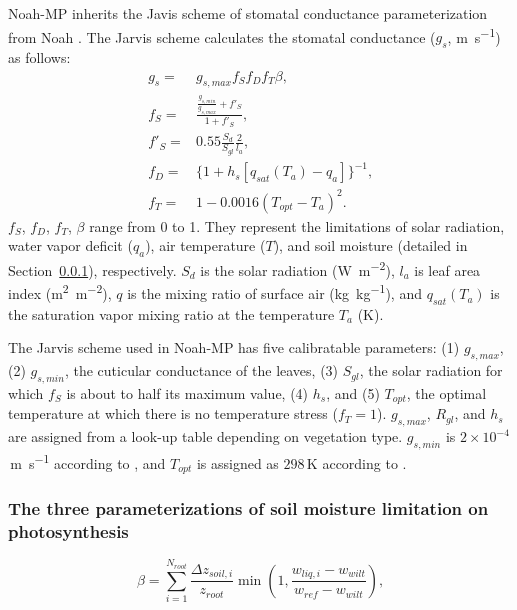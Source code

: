 \documentclass[essd]{copernicus}
\begin{document}
Noah-MP inherits the Javis scheme \citep{jarvis1976PTRSLBBS} of stomatal
conductance parameterization from Noah \citep{chen2001MWR}. The Jarvis scheme
calculates the stomatal conductance (\(g_s\), \si{m~s^{-1}}) as follows:
\begin{align}
  g_s =    & g_{s,max} f_{S} f_{D} f_{T} \beta \text{,} \\
  f_{S} =  & \frac{\frac{g_{s,min}}{g_{s,max}}+f'_{S}}{1+f'_{S}} \text{,} \\
  f'_{S} = & 0.55 \frac{S_d}{S_{gl}} \frac{2}{l_a} \text{,} \\
  f_{D} =  & \{1+h_s[q_{sat}(T_a)-q_a]\}^{-1} \text{,} \\
  f_{T} =  & 1- 0.0016 (T_{opt} - T_a)^2 \text{.}
\end{align}
\(f_{S}\), \(f_{D}\), \(f_{T}\), \(\beta\) range from 0 to 1. They represent the
limitations of solar radiation, water vapor deficit (\(q_a\)), air temperature
(\(T\)), and soil moisture (detailed in Section~\ref{sec:data:noahmp:beta}),
respectively. \(S_d\) is the solar radiation (\si{W~m^{-2}}), \(l_a\) is leaf
area index (\si{m^2~m^{-2}}), \(q\) is the mixing ratio of surface air
(\si{kg~kg^{-1}}), and \(q_{sat}(T_a)\) is the saturation vapor mixing ratio at
the temperature \(T_a\) (\si{K}).

The Jarvis scheme used in Noah-MP has five calibratable parameters: (1)
\(g_{s,max}\), (2) \(g_{s,min}\), the cuticular conductance of the leaves, (3)
\(S_{gl}\), the solar radiation for which \(f_{S}\) is about to half its maximum
value, (4) \(h_s\), and (5) \(T_{opt}\), the optimal temperature at which there
is no temperature stress (\(f_{T}=1\)). \(g_{s,max}\), \(R_{gl}\), and \(h_s\)
are assigned from a look-up table depending on vegetation type. \(g_{s,min}\) is
\(2\times10^{-4}\)\,\si{m~s^{-1}} according to \citet{dickinson1993}, and
\(T_{opt}\) is assigned as \(298\)\,\si{K} according to \citet{noilhan1989MWR}.

\subsubsection{The three parameterizations of soil moisture limitation on
  photosynthesis}\label{sec:data:noahmp:beta}

\begin{equation}
  \beta = \sum_{i=1}^{N_{root}} \frac{\Delta z_{soil,i}}{z_{root}}
  \min\left(1, \frac{w_{liq,i} - w_{wilt}}{w_{ref} - w_{wilt}}\right)
  \text{,}
\end{equation}
\end{document}
